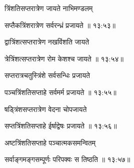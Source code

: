 {\devanagarifont त्रिंशतिसप्तरात्रेण जायते नाभिमण्डलम् \thinspace{\dandab} \dontdisplaylinenum }%


{\devanagarifont सप्तैकत्रिंशरात्रेण सर्वरन्ध्रं प्रजायते {॥ १३:५३॥} \veg\dontdisplaylinenum }%
 
{\devanagarifont द्वात्रिंशत्सप्तरात्रेण नखविंशति जायते \thinspace{\dandab} \dontdisplaylinenum }%


{\devanagarifont त्रेत्रिंशत्सप्तरात्रेण रोम केशश्च जायते {॥ १३:५४॥} \veg\dontdisplaylinenum }%

{\devanagarifont सप्तरात्रचतुस्त्रिंशे सर्वसन्धिः प्रजायते \thinspace{\dandab} \dontdisplaylinenum }%


{\devanagarifont पञ्चत्रिंशतिसप्ताहे सर्वमर्म प्रजायते {॥ १३:५५॥} \veg\dontdisplaylinenum }%

{\devanagarifont षड्त्रिंशसप्तरात्रेण वेदना चोपजायते \thinspace{\dandab} \dontdisplaylinenum }%
 

{\devanagarifont सप्तत्रिंशतिसप्ताहे ईर्षाद्वेषः प्रजायते {॥ १३:५६॥} \veg\dontdisplaylinenum }%

{\devanagarifont अष्टत्रिंशतिसप्ताहे पञ्चात्मकसमन्वितम् \thinspace{\dandab} \dontdisplaylinenum }%
 

{\devanagarifont सर्वाङ्गमङ्गसम्पूर्णः परिपक्वः स तिष्ठति {॥ १३:५७॥} \veg\dontdisplaylinenum }%

